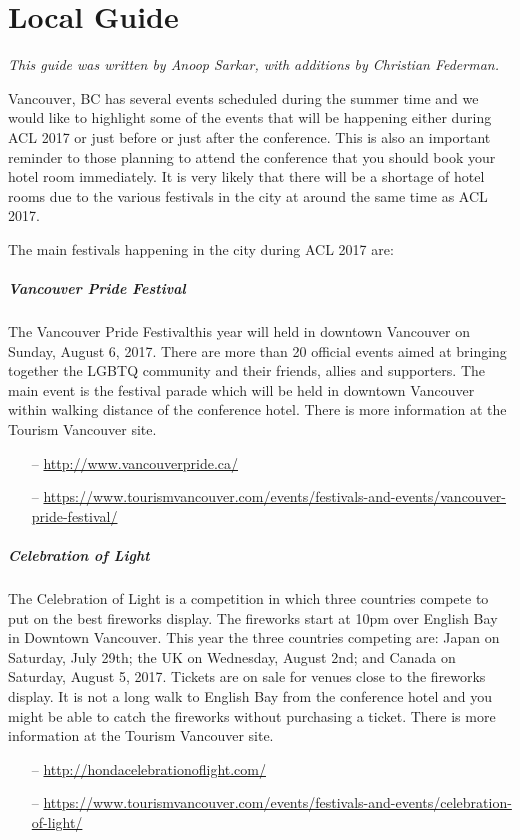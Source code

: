 \chapter{Local Guide}

\emph{This guide was written by Anoop Sarkar, with additions by Christian Federman.}

Vancouver, BC has several events scheduled during the summer time and we would like to highlight some of the events that will be happening either during ACL 2017 or just before or just after the conference. This is also an important reminder to those planning to attend the conference that you should book your hotel room immediately. It is very likely that there will be a shortage of hotel rooms due to the various festivals in the city at around the same time as ACL 2017.

The main festivals happening in the city during ACL 2017 are:

\paragraph{Vancouver Pride Festival}
The Vancouver Pride Festivalthis year will held in downtown Vancouver on Sunday, August 6, 2017. There are more than 20 official events aimed at bringing together the LGBTQ community and their friends, allies and supporters. The main event is the festival parade which will be held in downtown Vancouver within walking distance of the conference hotel. There is more information at the Tourism Vancouver site.
%
\begin{itemize}
\item[--]\url{http://www.vancouverpride.ca/}
\item[--]\url{https://www.tourismvancouver.com/events/festivals-and-events/vancouver-pride-festival/}
\end{itemize}

\paragraph{Celebration of Light}
The Celebration of Light is a competition in which three countries compete to put on the best fireworks display. The fireworks start at 10pm over English Bay in Downtown Vancouver. This year the three countries competing are: Japan on Saturday, July 29th; the UK on Wednesday, August 2nd; and Canada on Saturday, August 5, 2017. Tickets are on sale for venues close to the fireworks display. It is not a long walk to English Bay from the conference hotel and you might be able to catch the fireworks without purchasing a ticket. There is more information at the Tourism Vancouver site.
%
\begin{itemize}
\item[--]\url{http://hondacelebrationoflight.com/}
\item[--]\url{https://www.tourismvancouver.com/events/festivals-and-events/celebration-of-light/}
\end{itemize}

